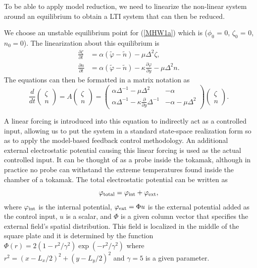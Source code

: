 \documentclass[12pt,lot, lof]{puthesis}
\begin{document}
To be able to apply model reduction, we need to linearize the non-linear system around an equilibrium to obtain a LTI system that can then be reduced.

We choose an unstable equilibrium point for (\ref{MHW1a}) which is ($\phi_0$ = 0, $\zeta_0$ = 0, $n_0=0$).
The linearization about this equilibrium is
\begin{subequations}
\begin{align}
\frac{\partial \zeta}{\partial t}  &= \alpha (\tilde{\varphi}-\tilde{n}) - \mu \Delta^2 \zeta, \label{eq:HW_lin_a} \\
\frac{\partial n}{\partial t}   &= \alpha (\tilde{\varphi}- \tilde{n}) -\kappa \frac{\partial \varphi}{\partial y}- \mu \Delta^2 n. \label{eq:HW_lin_b}
\end{align}
\end{subequations}
The equations can then be formatted in a matrix notation as
%
\begin{equation}
	\renewcommand\arraystretch{0.8}
	\frac{d}{dt} \begin{pmatrix} \zeta \\ n \end{pmatrix}
	= A \begin{pmatrix} \zeta \\ n \end{pmatrix}
	= \begin{pmatrix}
		\alpha \Delta^{-1} - \mu \Delta^2 & -\alpha \\
		\alpha \Delta^{-1} - \kappa \frac{\partial}{\partial y} \Delta^{-1} & -\alpha - \mu \Delta^2
	\end{pmatrix} \begin{pmatrix} \zeta \\ n \end{pmatrix}.
	\label{mat22}
\end{equation}

A linear forcing is introduced into this equation to indirectly act as a controlled input, allowing us to put the system in a standard state-space realization form so as to apply the model-based feedback control methodology.
An additional external electrostatic potential causing this linear forcing is used as the actual controlled input.
It can be thought of as a probe inside the tokamak, although in practice no probe can withstand the extreme temperatures found inside the chamber of a tokamak. The total electrostatic potential can be written as
%
\begin{equation}
	\varphi_{\rm total} = \varphi_{\rm int} + \varphi_{\rm ext},
\end{equation}
%
where $\varphi_{\rm int}$ is the internal potential, $\varphi_{\rm ext} = \Phi u$ is the external potential added as the control input, $u$ is a scalar, and $\Phi$ is a given column vector that specifies the external field's spatial distribution.
This field is localized in the middle of the square plate and it is determined by the function $\Phi(r) = 2 \left(1-r^2/\gamma^2\right) \exp \left(-r^2/\gamma^2\right)$ where $r^2 =\left(x- L_x/2\right)^2 +\left(y- L_y/2\right)^2 $ and $\gamma = 5$ is a given parameter.
\end{document}
